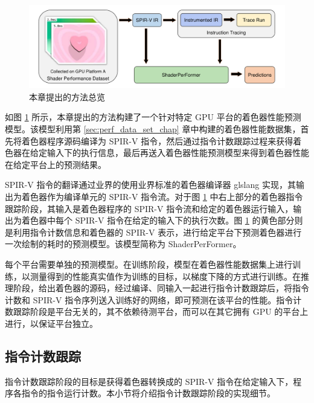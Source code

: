 \begin{figure}[h]
  \centering
  \includegraphics[width=1\linewidth]{figures/OverviewNewNewNew.pdf}
  \caption{本章提出的方法总览}
  \label{fig:pipeline_overview}
\end{figure}

如图 \ref{fig:pipeline_overview} 所示，本{\amend 章}提出的方法构建了一个针对特定 GPU 平台的着色器性能预测模型。{\amend 该模型利用第 \ref{sec:perf_data_set_chap} 章中构建的着色器性能数据集，首先将着色器程序源码编译为 SPIR-V 指令，然后通过指令计数跟踪过程来获得着色器在给定输入下的执行信息，最后再送入着色器性能预测模型来得到着色器性能在给定平台上的预测结果。}

{\amend SPIR-V 指令的翻译}通过业界的使用业界标准的着色器编译器 glslang \cite{glslang} 实现，{\amend 其输出为着色器作为编译单元的 SPIR-V 指令流。对于图 \ref{fig:pipeline_overview} 中右上部分的着色器指令跟踪阶段，其输入是着色器程序的 SPIR-V 指令流和给定的着色器运行输入，输出为着色器中每个 SPIR-V 指令在给定的输入下的执行次数。图 \ref{fig:pipeline_overview} 的黄色部分则是利用指令计数信息和着色器的 SPIR-V 表示，进行给定平台下预测着色器进行一次绘制的耗时的预测模型。该模型简称为 ShaderPerFormer。}

{\amend 每个平台需要单独的预测模型。在训练阶段，模型在着色器性能数据集上进行训练，以测量得到的性能真实值作为训练的目标，以梯度下降的方式进行训练。在推理阶段，给出着色器的源码，经过编译、同输入一起进行指令计数跟踪后，将指令计数和 SPIR-V 指令序列送入训练好的网络，即可预测在该平台的性能。指令计数跟踪阶段是平台无关的，其不依赖待测平台，而可以在其它拥有 GPU 的平台上进行，以保证平台独立。}

\subsection{指令计数跟踪}

{\amend 指令计数跟踪阶段的目标是获得着色器转换成的 SPIR-V 指令在给定输入下，程序各指令的指令运行计数。本小节将介绍指令计数跟踪阶段的实现细节。}

